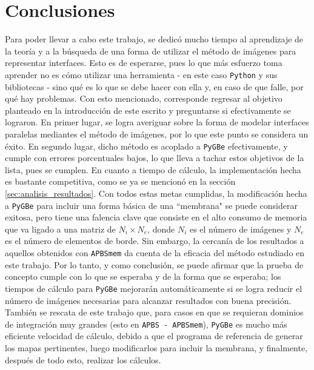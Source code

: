 \documentclass[12pt, oneside, numbers, spanish]{ezthesis}
\numberwithin{equation}{section}
\begin{document}
\chapter{Conclusiones}
Para poder llevar a cabo este trabajo, se dedicó mucho tiempo al aprendizaje de la teoría y a la búsqueda de una forma de utilizar el método de imágenes para representar interfaces. Esto es de esperarse, pues lo que más esfuerzo toma aprender no es cómo utilizar una herramienta - en este caso \texttt{Python} y sus bibliotecas - sino qué es lo que se debe hacer con ella y, en caso de que falle, por qué hay problemas. Con esto mencionado, corresponde regresar al objetivo planteado en la introducción de este escrito y preguntarse si efectivamente se lograron. En primer lugar, se logra averiguar sobre la forma de modelar interfaces paralelas mediantes el método de imágenes, por lo que este punto se considera un éxito. En segundo lugar, dicho método es acoplado a \texttt{PyGBe} efectivamente, y cumple con errores porcentuales bajos, lo que lleva a tachar estos objetivos de la lista, pues se cumplen. En cuanto a tiempo de cálculo, la implementación hecha es bastante competitiva, como se ya se mencionó en la sección \ref{sec:analisis_resultados}. Con todos estas metas cumplidas, la modificación hecha a \texttt{PyGBe} para incluir una forma básica de una ``membrana" se puede considerar exitosa, pero tiene una falencia clave que consiste en el alto consumo de memoria que va ligado a una matriz de $N_i \times N_e$, donde $N_i$ es el número de imágenes y $N_e$ es el número de elementos de borde. Sin embargo, la cercanía de los resultados a aquellos obtenidos con \texttt{APBSmem} da cuenta de la eficacia del método estudiado en este trabajo. Por lo tanto, y como conclusión, se puede afirmar que la prueba de concepto cumple con lo que se esperaba y de la forma que se esperaba; los tiempos de cálculo para \texttt{PyGBe} mejorarán automáticamente si se logra reducir el número de imágenes necesarias para alcanzar resultados con buena precisión. También se rescata de este trabajo que, para casos en que se requieran dominios de integración muy grandes (esto en \texttt{APBS - APBSmem}), \texttt{PyGBe} es mucho más eficiente velocidad de cálculo, debido a que el programa de referencia de generar los mapas pertinentes, luego modificarlos para incluir la membrana, y finalmente, después de todo esto, realizar los cálculos.
\end{document}
